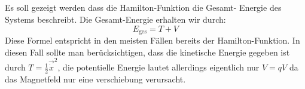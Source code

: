 \subsection{}
Es soll gezeigt werden dass die Hamilton-Funktion die Gesamt- Energie des Systems beschreibt.
Die Gesamt-Energie erhalten wir durch:
\[
    E_\text{ges} = T+V
\]
Diese Formel entspricht in den meisten Fällen bereits der Hamilton-Funktion.
In diesen Fall sollte man berücksichtigen, dass die kinetische Energie gegeben ist durch $T= \frac 12 \vec\dot x^2$,
die potentielle Energie lautet allerdings eigentlich nur $V=qV$ da das Magnetfeld nur eine verschiebung verursacht.



